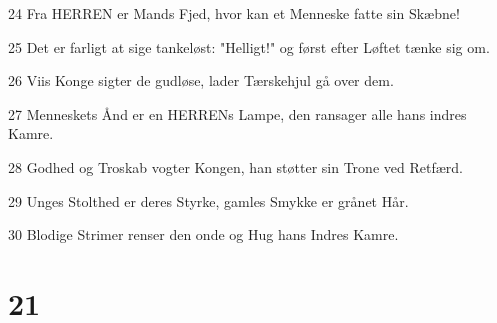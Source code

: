 \par 24 Fra HERREN er Mands Fjed, hvor kan et Menneske fatte sin Skæbne!
\par 25 Det er farligt at sige tankeløst: "Helligt!" og først efter Løftet tænke sig om.
\par 26 Viis Konge sigter de gudløse, lader Tærskehjul gå over dem.
\par 27 Menneskets Ånd er en HERRENs Lampe, den ransager alle hans indres Kamre.
\par 28 Godhed og Troskab vogter Kongen, han støtter sin Trone ved Retfærd.
\par 29 Unges Stolthed er deres Styrke, gamles Smykke er grånet Hår.
\par 30 Blodige Strimer renser den onde og Hug hans Indres Kamre.

\chapter{21}

